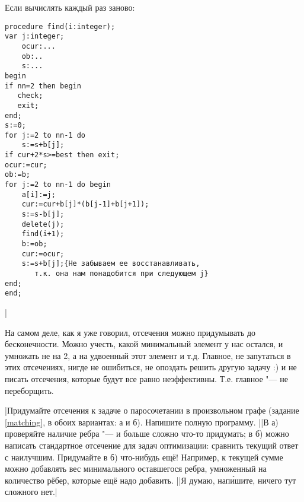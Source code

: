 Если вычислять каждый раз заново:

\begin{codesample}\begin{verbatim}
procedure find(i:integer);
var j:integer;
    ocur:...
    ob:..
    s:...
begin
if nn=2 then begin
   check;
   exit;
end;
s:=0;
for j:=2 to nn-1 do
    s:=s+b[j];
if cur+2*s>=best then exit;
ocur:=cur;
ob:=b;
for j:=2 to nn-1 do begin
    a[i]:=j;
    cur:=cur+b[j]*(b[j-1]+b[j+1]);
    s:=s-b[j];
    delete(j);
    find(i+1);
    b:=ob;
    cur:=ocur;
    s:=s+b[j];{Не забываем ее восстанавливать, 
       т.к. она нам понадобится при следующем j}
end;
end;
\end{verbatim}\end{codesample}
|

На самом деле, как я уже говорил, отсечения можно придумывать до бесконечности. Можно учесть, какой минимальный элемент у нас остался, и умножать не на 2, а на удвоенный этот элемент и т.д. Главное, не запутаться в этих отсечениях, нигде не ошибиться, не опоздать решить другую задачу :) и не писать отсечения, которые будут все равно неэффективны. Т.е. главное "--- не переборщить.

\task|Придумайте отсечения к задаче о паросочетании в произвольном графе 
(задание \ref{matching}, в обоих вариантах: а и б). Напишите полную программу.
||В а) проверяйте наличие ребра "--- и больше сложно что-то придумать; в б) можно написать стандартное отсечение для задач 
оптимизации: сравнить текущий ответ с наилучшим. Придумайте в б) что-нибудь ещё! Например, к текущей сумме можно 
добавлять вес минимального оставшегося ребра, умноженный на количество рёбер, которые ещё 
надо добавить.
||Я думаю, нап\'{и}шите, ничего тут сложного нет.|
